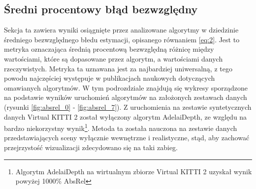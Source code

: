 \subsection{Średni procentowy błąd bezwzględny}
Sekcja ta zawiera wyniki osiągnięte przez analizowane algorytmy w dziedzinie średniego bezwzględnego błedu estymacji, opisanego równaniem \ref{eq:2}. Jest to metryka oznaczająca średnią procentową bezwzględną różnicę między wartościami, które są dopasowane przez algorytm, a wartościami danych rzeczywistych. Metryka ta uznawana jest za najbardziej uniwersalną, z tego powodu najczęściej występuje w publikacjach naukowych dotyczących omawianych algorytmów. W tym podrozdziale znajdują się wykresy sporządzone na podstawie wyników uruchomień algorytmów na założonych zestawach danych (rysunki \ref{fig:absrel_0} - \ref{fig:absrel_7}). Z uruchomienia na zestawie syntetycznych danych Virtual KITTI 2 został wyłączony algorytm AdelaiDepth, ze względu na bardzo niekorzystny wynik\footnote{Algorytm AdelaiDepth na wirtualnym zbiorze Virtual KITTI 2 uzyskał wynik powyżej 1000\% AbsRel}. Metoda ta została nauczona na zestawie danych przedstawiających sceny wyłącznie wewnętrzne i realistyczne, stąd, aby zachować przejrzystość wizualizacji zdecydowano się na taki zabieg.


